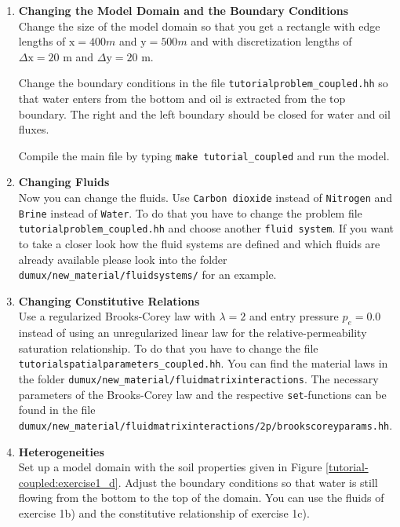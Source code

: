 \begin{enumerate}
\item \textbf{Changing the Model Domain and the Boundary Conditions} \\

  Change the size of the model domain so that you get a rectangle with
  edge lengths of $\text{x} = 400 m$ and $\text{y} = 500 m$ and with
  discretization lengths of $\Delta \text{x} = 20$ m and $\Delta
  \text{y} = 20$ m.
  
  Change the boundary conditions in the file
  \texttt{tutorialproblem\_coupled.hh} so that water enters from the
  bottom and oil is extracted from the top boundary. The right and the
  left boundary should be closed for water and oil fluxes. 

  Compile the main file by typing \texttt{make tutorial\_coupled} and
  run the model.


\item \textbf{Changing Fluids} \\
  Now you can change the fluids. Use \texttt{Carbon dioxide} instead of
  \texttt{Nitrogen} and \texttt{Brine} instead of \texttt{Water}. To do
  that you have to change the problem file
  \texttt{tutorialproblem\_coupled.hh} and choose another \texttt{fluid system}. 
  If you want to take a closer look how the fluid systems are defined 
  and which fluids are already available please look into the folder \verb+dumux/new_material/fluidsystems/+
  for an example.


\item \textbf{Changing Constitutive Relations} \\
  Use a regularized Brooks-Corey law with $\lambda = 2$ and entry pressure $p_e =
  0.0$ instead of using an unregularized linear law for the
  relative-permeability saturation relationship. To do that you have
  to change the file \texttt{tutorialspatialparameters\_coupled.hh}. 
 You can find the material laws in the folder 
  \verb+dumux/new_material/fluidmatrixinteractions+. The necessary parameters
of the Brooks-Corey law and the respective \texttt{set}-functions can be found
 in the file \verb+dumux/new_material/fluidmatrixinteractions/2p/brookscoreyparams.hh+.
 
\item \textbf{Heterogeneities}  \\
  Set up a model domain with the soil properties given in Figure
  \ref{tutorial-coupled:exercise1_d}. Adjust the boundary conditions
  so that water is still flowing from the bottom to the top of the
  domain. You can use the fluids of exercise 1b) and the constitutive
  relationship of exercise 1c).


\end{enumerate}
